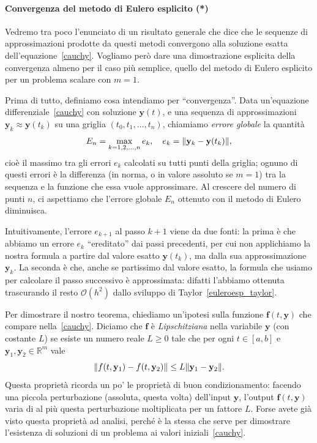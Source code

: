 \documentclass[a4paper]{report}
\DeclarePairedDelimiter{\norm}{\lVert}{\rVert}
\theoremstyle{definition}
\theoremstyle{remark}
\newcommand{\y}{\mathbf{y}}
\newcommand{\f}{\mathbf{f}}
\newcommand{\checkkey}[1]{%
        \ifstrequal{#1}{inf}{\setbool{showcontent}{true}}{}%
    }
\newenvironment{conditional}[1][]{%
        \setbool{showcontent}{false}%
        \forcsvlist\checkkey{#1}%
        \ifbool{showcontent}{\begingroup}{\expandafter\comment}%
    }{%
        \ifbool{showcontent}{\endgroup}{\expandafter\endcomment}%
    }
\newcommand{\checkkey}[1]{%
        \ifstrequal{#1}{ich}{\setbool{showcontent}{true}}{}%
    }
\newenvironment{conditional}[1][]{%
        \setbool{showcontent}{false}%
        \forcsvlist\checkkey{#1}%
        \ifbool{showcontent}{\begingroup}{\expandafter\comment}%
    }{%
        \ifbool{showcontent}{\endgroup}{\expandafter\endcomment}%
    }
\begin{document}
\begin{conditional}[ich]
\paragraph{Convergenza del metodo di Eulero esplicito (*)}
Vedremo tra poco l'enunciato di un risultato generale che dice che le sequenze di approssimazioni prodotte da questi metodi convergono alla soluzione esatta dell'equazione~\eqref{cauchy}. Vogliamo però dare una dimostrazione esplicita della convergenza almeno per il caso più semplice, quello del metodo di Eulero esplicito per un problema scalare con $m=1$.

Prima di tutto, definiamo cosa intendiamo per ``convergenza''. Data un'equazione differenziale~\eqref{cauchy} con soluzione $\y(t)$, e una sequenza di approssimazioni $\y_k \approx \y(t_k)$ su una griglia $(t_0,t_1,\dots,t_n)$, chiamiamo \emph{errore globale} la quantità
\begin{equation} \label{globalerror}
    E_n = \max_{k=1,2,\dots,n} e_k, \quad e_k = \norm{\y_k - \y(t_k)},
\end{equation}
cioè il massimo tra gli errori $e_k$ calcolati su tutti punti della griglia; ognuno di questi errori è la differenza (in norma, o in valore assoluto se $m=1$) tra la sequenza e la funzione che essa vuole approssimare. Al crescere del numero di punti $n$, ci aspettiamo che l'errore globale $E_n$ ottenuto con il metodo di Eulero diminuisca.

Intuitivamente, l'errore $e_{k+1}$ al passo $k+1$ viene da due fonti: la prima è che abbiamo un errore $e_k$ ``ereditato'' dai passi precedenti, per cui non applichiamo la nostra formula a partire dal valore esatto $\y(t_k)$, ma dalla sua approssimazione $\y_k$. La seconda è che, anche se partissimo dal valore esatto, la formula che usiamo per calcolare il passo successivo è approssimata: difatti l'abbiamo ottenuta trascurando il resto $\mathcal{O}(h^2)$ dallo sviluppo di Taylor~\eqref{euleroesp_taylor}.

Per dimostrare il nostro teorema, chiediamo un'ipotesi sulla funzione $\f(t,\y)$ che compare nella~\ref{cauchy}. Diciamo che $\f$ è \emph{Lipschitziana} nella variabile $\y$ (con costante $L$) se esiste un numero reale $L \geq 0$ tale che per ogni $t\in [a,b]$ e $\y_1,\y_2\in\mathbb{R}^m$ vale
\[
\norm{f(t, \y_1) - f(t, \y_2)} \leq L\norm{\y_1 - \y_2}.
\]
Questa proprietà ricorda un po' le proprietà di buon condizionamento: facendo una piccola perturbazione (assoluta, questa volta) dell'input $\y$, l'output $\f(t,\y)$ varia di al più questa perturbazione moltiplicata per un fattore $L$. Forse avete già visto questa proprietà ad analisi, perché è la stessa che serve per dimostrare l'esistenza di soluzioni di un problema ai valori iniziali~\eqref{cauchy}.


\end{conditional}
\end{document}
